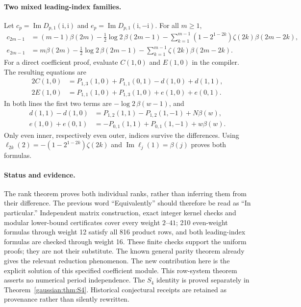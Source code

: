 \paragraph{Two mixed leading-index families.}
Let $c_p=\operatorname{Im}D_{p,1}(\mathrm i,\mathrm i)$ and
$e_p=\operatorname{Im}D_{p,1}(\mathrm i,-\mathrm i)$. For all $m\ge1$,
\begin{align}
 c_{2m-1}&=(m-1)\beta(2m)-\tfrac12\log2\,\beta(2m-1)
 -\sum_{k=1}^{m-1}(1-2^{1-2k})\zeta(2k)\beta(2m-2k),
 \label{l4rank:eq:c-family}\\
 e_{2m-1}&=m\beta(2m)-\tfrac12\log2\,\beta(2m-1)
 -\sum_{k=1}^{m-1}\zeta(2k)\beta(2m-2k).
 \label{l4rank:eq:e-family}
\end{align}
For a direct coefficient proof, evaluate $C(1,0)$ and $E(1,0)$ in the compiler.
The resulting equations are
\begin{align*}
 2C(1,0)&=P_{1,3}(1,0)+P_{1,1}(0,1)-d(1,0)+d(1,1),\\
 2E(1,0)&=P_{1,1}(1,0)+P_{1,3}(1,0)+e(1,0)+e(0,1).
\end{align*}
In both lines the first two terms are $-\log2\,\beta(w-1)$, and
\begin{align*}
 d(1,1)-d(1,0)&=P_{1,2}(1,1)-P_{1,2}(1,-1)+N\beta(w),\\
 e(1,0)+e(0,1)&=-P_{0,1}(1,1)+P_{0,1}(1,-1)+w\beta(w).
\end{align*}
Only even inner, respectively even outer, indices survive the differences.
Using $\ell_{2k}(2)=-(1-2^{1-2k})\zeta(2k)$ and
$\operatorname{Im}\ell_j(1)=\beta(j)$ proves both formulas.

\paragraph{Status and evidence.}
The rank theorem proves both individual ranks, rather than inferring them
from their difference. The previous word ``Equivalently'' should therefore
be read as ``In particular.'' Independent matrix construction, exact integer
kernel checks and modular lower-bound certificates cover every weight
$2$--$41$; 210 even-weight formulas through weight 12 satisfy all 816 product
rows, and both leading-index formulas are checked through weight 16.
These finite checks support the uniform proofs; they are not their substitute.
The known general parity theorem already gives the relevant reduction
phenomenon. The new contribution here is the explicit solution of this
specified coefficient module. This row-system theorem asserts no numerical period independence. The
$S_4$ identity is proved separately in Theorem~\ref{gaussian:thm:S4}. Historical conjectural receipts are
retained as provenance rather than silently rewritten.
